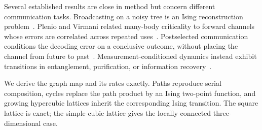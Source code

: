 \documentclass[aps,prl,reprint,amsmath,amssymb,superscriptaddress,nofootinbib,floatfix]{revtex4-2}
\begin{document}
Several established results are close in method but concern different communication tasks. Broadcasting on a noisy tree is an Ising reconstruction problem~\cite{Evans2000}. Plenio and Virmani related many-body criticality to forward channels whose errors are correlated across repeated uses~\cite{Plenio2007,Plenio2008}. Postselected communication conditions the decoding error on a conclusive outcome, without placing the channel from future to past~\cite{JiRegulaWilde2024}. Measurement-conditioned dynamics instead exhibit transitions in entanglement, purification, or information recovery~\cite{Skinner2019,Choi2020,Gullans2020,Roser2026}.

We derive the graph map and its rates exactly. Paths reproduce serial composition, cycles replace the path product by an Ising two-point function, and growing hypercubic lattices inherit the corresponding Ising transition. The square lattice is exact; the simple-cubic lattice gives the locally connected three-dimensional case.
\end{document}
